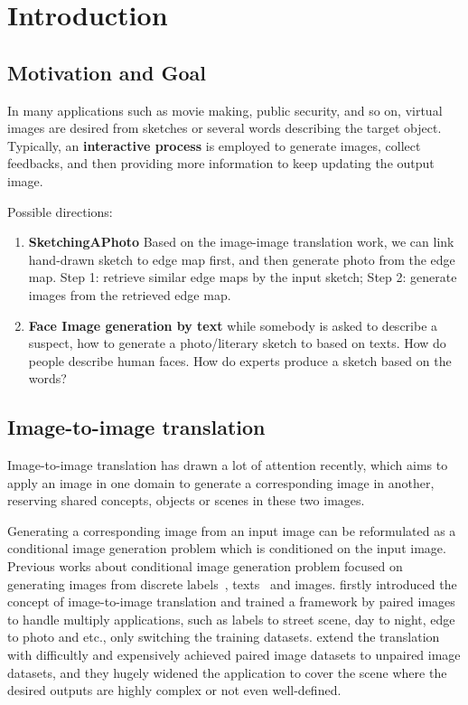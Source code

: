 \section{Introduction}
\subsection{Motivation and Goal}
In many applications such as movie making, public security, and so on, virtual images are desired from sketches or several words describing the target object. Typically, an \textbf{interactive process} is employed to generate images, collect feedbacks, and then providing more information to keep updating the output image.

Possible directions:
\begin{enumerate}
	\item \textbf{SketchingAPhoto} Based on the image-image translation work, we can link hand-drawn sketch to edge map first, and then generate photo from the edge map. Step 1: retrieve similar edge maps by the input sketch; Step 2: generate images from the retrieved edge map.
	\item \textbf{Face Image generation by text} while somebody is asked to describe a suspect, how to generate a photo/literary sketch to based on texts. How do people describe human faces. How do experts produce a sketch based on the words? 
\end{enumerate}


\subsection{Image-to-image translation}
Image-to-image translation has drawn a lot of attention recently, which aims to apply an image in one domain to generate a corresponding image in another, reserving shared concepts, objects or scenes in these two images.  

Generating a corresponding image from an input image can be reformulated as a conditional image generation problem which is conditioned on the input image. Previous works about conditional image generation problem focused on generating images from discrete labels~\cite{CGAN}, texts~\cite{Reed2016} and images.
\cite{pix2pix} firstly introduced the concept of image-to-image translation and trained a framework by paired images to handle multiply applications, such as labels to street scene, day to night, edge to photo and etc., only switching the training datasets.
%
\cite{CycleGAN, DiscoGAN, UNIT} extend the translation with difficultly and expensively achieved paired image datasets to unpaired image datasets, and they hugely widened the application to cover the scene where the desired outputs are highly complex or not even well-defined.

